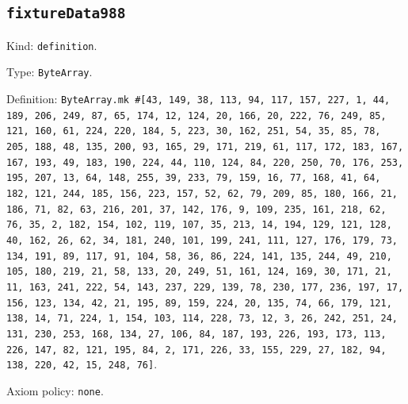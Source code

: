 \documentclass[11pt]{article}
\begin{document}
\subsection*{\texttt{fixtureData988}}
\noindent Kind: \texttt{definition}.\par
\noindent Type: \texttt{ByteArray}.\par
\noindent Definition: \texttt{ByteArray.mk \#[43, 149, 38, 113, 94, 117, 157, 227, 1, 44, 189, 206, 249, 87, 65, 174, 12, 124, 20, 166, 20, 222, 76, 249, 85, 121, 160, 61, 224, 220, 184, 5, 223, 30, 162, 251, 54, 35, 85, 78, 205, 188, 48, 135, 200, 93, 165, 29, 171, 219, 61, 117, 172, 183, 167, 167, 193, 49, 183, 190, 224, 44, 110, 124, 84, 220, 250, 70, 176, 253, 195, 207, 13, 64, 148, 255, 39, 233, 79, 159, 16, 77, 168, 41, 64, 182, 121, 244, 185, 156, 223, 157, 52, 62, 79, 209, 85, 180, 166, 21, 186, 71, 82, 63, 216, 201, 37, 142, 176, 9, 109, 235, 161, 218, 62, 76, 35, 2, 182, 154, 102, 119, 107, 35, 213, 14, 194, 129, 121, 128, 40, 162, 26, 62, 34, 181, 240, 101, 199, 241, 111, 127, 176, 179, 73, 134, 191, 89, 117, 91, 104, 58, 36, 86, 224, 141, 135, 244, 49, 210, 105, 180, 219, 21, 58, 133, 20, 249, 51, 161, 124, 169, 30, 171, 21, 11, 163, 241, 222, 54, 143, 237, 229, 139, 78, 230, 177, 236, 197, 17, 156, 123, 134, 42, 21, 195, 89, 159, 224, 20, 135, 74, 66, 179, 121, 138, 14, 71, 224, 1, 154, 103, 114, 228, 73, 12, 3, 26, 242, 251, 24, 131, 230, 253, 168, 134, 27, 106, 84, 187, 193, 226, 193, 173, 113, 226, 147, 82, 121, 195, 84, 2, 171, 226, 33, 155, 229, 27, 182, 94, 138, 220, 42, 15, 248, 76]}.\par
\noindent Axiom policy: \texttt{none}.\par
\end{document}
